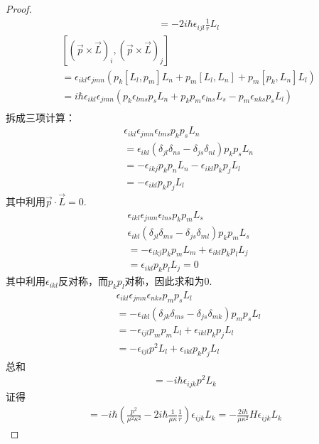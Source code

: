 \begin{proof}
\begin{align*}
&= - 2i\hbar \epsilon_{ijl}\frac{1}{r}L_l
\end{align*}
\begin{align*}
    &[(\vec p \times \vec L)_i,(\vec p \times \vec L)_j] \\
&= \epsilon_{ikl}\epsilon_{jmn}(p_k [L_l, p_m] L_n + p_m [L_l, L_n] + p_m[p_k, L_n]L_l)\\
&= i\hbar \epsilon_{ikl}\epsilon_{jmn} (p_k \epsilon_{lms}p_s L_n + p_k p_m \epsilon_{lns} L_s - p_m \epsilon_{nks} p_s L_l)\\
\end{align*}
拆成三项计算：
\begin{align*}
&\epsilon_{ikl}\epsilon_{jmn}\epsilon_{lms}p_k p_s L_n\\
&=\epsilon_{ikl}(\delta_{jl}\delta_{ns} - \delta_{js}\delta_{nl})p_k p_s L_n \\
&= -\epsilon_{ikj} p_k p_n L_n - \epsilon_{ikl} p_k p_j L_l\\
&= -\epsilon_{ikl}p_k p_j L_l
\end{align*}
其中利用$\vec p \cdot \vec L = 0$.
\begin{align*}
&\epsilon_{ikl}\epsilon_{jmn}\epsilon_{lns}p_k p_m L_s\\
&\epsilon_{ikl}(\delta_{jl}\delta_{ms}-\delta_{js}\delta_{ml})p_k p_m L_s\\
&= -\epsilon_{ikj} p_k p_m L_m + \epsilon_{ikl}p_k p_l L_j\\
&= \epsilon_{ikl}p_k p_l L_j = 0
\end{align*}
其中利用$\epsilon_{ikl}$反对称，而$p_k p_l$对称，因此求和为$0$.
\begin{align*}
&\epsilon_{ikl}\epsilon_{jmn}\epsilon_{nks}p_m p_s L_l\\
&=-\epsilon_{ikl}(\delta_{jk}\delta_{ms} - \delta_{js}\delta_{mk})p_m p_s L_l\\
&= -\epsilon_{ijl} p_m p_m L_l + \epsilon_{ikl} p_k p_j L_l\\
&= -\epsilon_{ijl} p^2 L_l + \epsilon_{ikl} p_k p_j L_l
\end{align*}
总和
\begin{align*}
    [(\vec p \times \vec L)_i,(\vec p \times \vec L)_j] = -i\hbar \epsilon_{ijk}p^2 L_k
\end{align*}
证得
\begin{align*}
    [R_i, R_j] = - i\hbar \left(\frac{p^2}{\mu^2\kappa^2} - 2i\hbar\frac{1}{\mu\kappa}\frac{1}{r}\right) \epsilon_{ijk}L_k = - \frac{2i\hbar}{\mu\kappa^2}H\epsilon_{ijk}L_k
\end{align*}
\end{proof}
